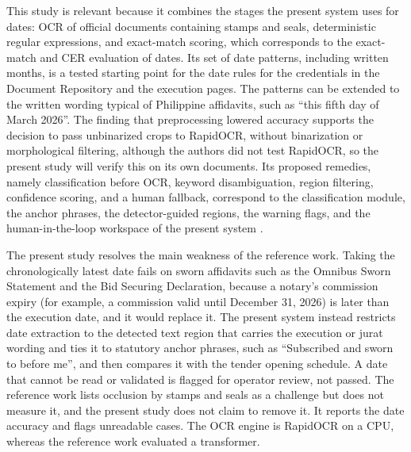 This study is relevant because it combines the stages the present system uses for dates: OCR of official documents containing stamps and seals, deterministic regular expressions, and exact-match scoring, which corresponds to the exact-match and CER evaluation of dates.
Its set of date patterns, including written months, is a tested starting point for the date rules for the credentials in the Document Repository and the execution pages.
The patterns can be extended to the written wording typical of Philippine affidavits, such as ``this fifth day of March 2026''.
The finding that preprocessing lowered accuracy supports the decision to pass unbinarized crops to RapidOCR, without binarization or morphological filtering, although the authors did not test RapidOCR, so the present study will verify this on its own documents.
Its proposed remedies, namely classification before OCR, keyword disambiguation, region filtering, confidence scoring, and a human fallback, correspond to the classification module, the anchor phrases, the detector-guided regions, the warning flags, and the human-in-the-loop workspace of the present system \cite{docxb2}.

The present study resolves the main weakness of the reference work.
Taking the chronologically latest date fails on sworn affidavits such as the Omnibus Sworn Statement and the Bid Securing Declaration, because a notary's commission expiry (for example, a commission valid until December 31, 2026) is later than the execution date, and it would replace it.
The present system instead restricts date extraction to the detected text region that carries the execution or jurat wording and ties it to statutory anchor phrases, such as ``Subscribed and sworn to before me'', and then compares it with the tender opening schedule.
A date that cannot be read or validated is flagged for operator review, not passed.
The reference work lists occlusion by stamps and seals as a challenge but does not measure it, and the present study does not claim to remove it.
It reports the date accuracy and flags unreadable cases.
The OCR engine is RapidOCR on a CPU, whereas the reference work evaluated a transformer.
